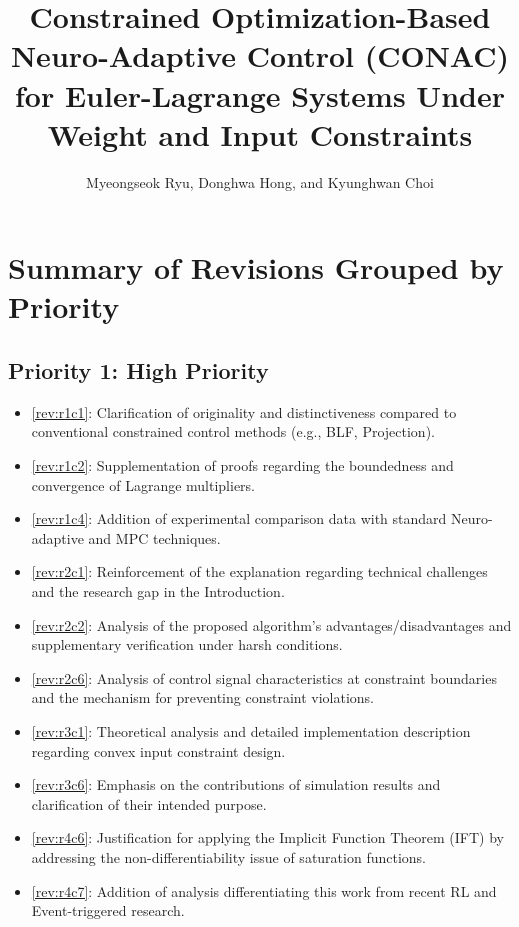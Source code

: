 \documentclass[12pt,english]{reviewresponse}
\title{
    Constrained Optimization-Based Neuro-Adaptive Control (CONAC) for Euler-Lagrange Systems Under Weight and Input Constraints
}
\author{
    Myeongseok Ryu, Donghwa Hong, and Kyunghwan Choi
}
\begin{document}
\maketitle
\newpage



\section*{Summary of Revisions Grouped by Priority}

\subsection*{Priority 1: High Priority}
\begin{itemize}
    \item \cref{rev:r1c1}: Clarification of originality and distinctiveness compared to conventional constrained control methods (e.g., BLF, Projection).
    \item \cref{rev:r1c2}: Supplementation of proofs regarding the boundedness and convergence of Lagrange multipliers.
    \item \cref{rev:r1c4}: Addition of experimental comparison data with standard Neuro-adaptive and MPC techniques.
    \item \cref{rev:r2c1}: Reinforcement of the explanation regarding technical challenges and the research gap in the Introduction.
    \item \cref{rev:r2c2}: Analysis of the proposed algorithm's advantages/disadvantages and supplementary verification under harsh conditions.
    \item \cref{rev:r2c6}: Analysis of control signal characteristics at constraint boundaries and the mechanism for preventing constraint violations.
    \item \cref{rev:r3c1}: Theoretical analysis and detailed implementation description regarding convex input constraint design.
    \item \cref{rev:r3c6}: Emphasis on the contributions of simulation results and clarification of their intended purpose.
    \item \cref{rev:r4c6}: Justification for applying the Implicit Function Theorem (IFT) by addressing the non-differentiability issue of saturation functions.
    \item \cref{rev:r4c7}: Addition of analysis differentiating this work from recent RL and Event-triggered research.
\end{itemize}
\end{document}
